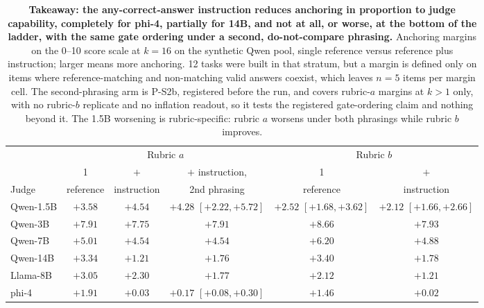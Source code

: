 \documentclass[11pt]{article}
\begin{document}
\begin{table}[tbp]
\centering
\small
\setlength{\tabcolsep}{5pt}
\begin{tabular}{lccccc}
\toprule
& \multicolumn{3}{c}{Rubric $a$} & \multicolumn{2}{c}{Rubric $b$} \\
\cmidrule(lr){2-4} \cmidrule(lr){5-6}
      & 1         & $+$         & $+$ instruction, & 1         & $+$         \\
Judge & reference & instruction & 2nd phrasing     & reference & instruction \\
\midrule
Qwen-1.5B & $+3.58$ & $+4.54$ & $+4.28$ {\scriptsize$[+2.22,+5.72]$} & $+2.52$ {\scriptsize$[+1.68,+3.62]$} & $+2.12$ {\scriptsize$[+1.66,+2.66]$} \\
Qwen-3B   & $+7.91$ & $+7.75$ & $+7.91$ & $+8.66$ & $+7.93$ \\
Qwen-7B   & $+5.01$ & $+4.54$ & $+4.54$ & $+6.20$ & $+4.88$ \\
Qwen-14B  & $+3.34$ & $+1.21$ & $+1.76$ & $+3.40$ & $+1.78$ \\
Llama-8B  & $+3.05$ & $+2.30$ & $+1.77$ & $+2.12$ & $+1.21$ \\
phi-4     & $+1.91$ & $+0.03$ & $+0.17$ {\scriptsize$[+0.08,+0.30]$} & $+1.46$ & $+0.02$ \\
\bottomrule
\end{tabular}
\caption{\textbf{Takeaway: the any-correct-answer instruction reduces anchoring in proportion to judge capability, completely for phi-4, partially for 14B, and not at all, or worse, at the bottom of the ladder, with the same gate ordering under a second, do-not-compare phrasing.}
Anchoring margins on the 0--10 score scale at $k{=}16$ on the synthetic Qwen pool, single reference versus reference plus instruction; larger means more anchoring.
12 tasks were built in that stratum, but a margin is defined only on items where reference-matching and non-matching valid answers coexist, which leaves $n{=}5$ items per margin cell.
The second-phrasing arm is P-S2b, registered before the run, and covers rubric-$a$ margins at $k{>}1$ only, with no rubric-$b$ replicate and no inflation readout, so it tests the registered gate-ordering claim and nothing beyond it.
The 1.5B worsening is rubric-specific: rubric $a$ worsens under both phrasings while rubric $b$ improves.}
\label{tab:mitig}
\end{table}
\end{document}
